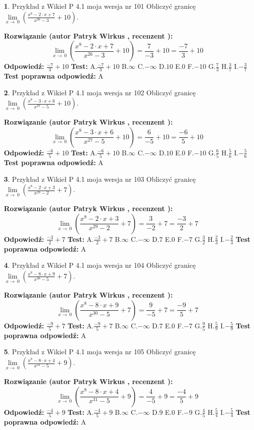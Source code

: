 \documentclass[12pt, a4paper]{article}
\theoremstyle{definition} %
\newtheorem{zad}{}
\newcommand{\zadStart}[1]{\begin{zad}#1\newline}
\newcommand{\zadStop}{\end{zad}}
\newcommand{\rozwStart}[2]{\noindent \textbf{Rozwiązanie (autor #1 , recenzent #2): }\newline}
\newcommand{\rozwStop}{\newline}
\newcommand{\odpStart}{\noindent \textbf{Odpowiedź:}\newline}
\newcommand{\odpStop}{\newline}
\newcommand{\testStart}{\noindent \textbf{Test:}\newline}
\newcommand{\testStop}{\newline}
\newcommand{\kluczStart}{\noindent \textbf{Test poprawna odpowiedź:}\newline}
\newcommand{\kluczStop}{\newline}
\begin{document}
\zadStart{Przykład z Wikieł P 4.1 moja wersja nr 101}
Obliczyć granicę $\lim\limits_{x\to\ 0}(\frac{x^{8}-2 \cdot x +7}{x^{26}-3}+10)$.
\zadStop
\rozwStart{Patryk Wirkus}{}
$$\lim\limits_{x\to\ 0}(\frac{x^{8}-2 \cdot x +7}{x^{26}-3}+10)=\frac{7}{-3}+10=\frac{-7}{3}+10$$
\rozwStop
\odpStart
$\frac{-7}{3}+10$
\odpStop
\testStart
A.$\frac{-7}{3}+10$
B.$\infty$
C.$-\infty$
D.$10$
E.$0$
F.$-10$
G.$\frac{7}{3}$
H.$\frac{3}{7}$
I.$-\frac{3}{7}$
\testStop
\kluczStart
A
\kluczStop



\zadStart{Przykład z Wikieł P 4.1 moja wersja nr 102}
Obliczyć granicę $\lim\limits_{x\to\ 0}(\frac{x^{8}-3 \cdot x +6}{x^{27}-5}+10)$.
\zadStop
\rozwStart{Patryk Wirkus}{}
$$\lim\limits_{x\to\ 0}(\frac{x^{8}-3 \cdot x +6}{x^{27}-5}+10)=\frac{6}{-5}+10=\frac{-6}{5}+10$$
\rozwStop
\odpStart
$\frac{-6}{5}+10$
\odpStop
\testStart
A.$\frac{-6}{5}+10$
B.$\infty$
C.$-\infty$
D.$10$
E.$0$
F.$-10$
G.$\frac{6}{5}$
H.$\frac{5}{6}$
I.$-\frac{5}{6}$
\testStop
\kluczStart
A
\kluczStop



\zadStart{Przykład z Wikieł P 4.1 moja wersja nr 103}
Obliczyć granicę $\lim\limits_{x\to\ 0}(\frac{x^{8}-2 \cdot x +3}{x^{29}-2}+7)$.
\zadStop
\rozwStart{Patryk Wirkus}{}
$$\lim\limits_{x\to\ 0}(\frac{x^{8}-2 \cdot x +3}{x^{29}-2}+7)=\frac{3}{-2}+7=\frac{-3}{2}+7$$
\rozwStop
\odpStart
$\frac{-3}{2}+7$
\odpStop
\testStart
A.$\frac{-3}{2}+7$
B.$\infty$
C.$-\infty$
D.$7$
E.$0$
F.$-7$
G.$\frac{3}{2}$
H.$\frac{2}{3}$
I.$-\frac{2}{3}$
\testStop
\kluczStart
A
\kluczStop



\zadStart{Przykład z Wikieł P 4.1 moja wersja nr 104}
Obliczyć granicę $\lim\limits_{x\to\ 0}(\frac{x^{8}-8 \cdot x +9}{x^{30}-5}+7)$.
\zadStop
\rozwStart{Patryk Wirkus}{}
$$\lim\limits_{x\to\ 0}(\frac{x^{8}-8 \cdot x +9}{x^{30}-5}+7)=\frac{9}{-5}+7=\frac{-9}{5}+7$$
\rozwStop
\odpStart
$\frac{-9}{5}+7$
\odpStop
\testStart
A.$\frac{-9}{5}+7$
B.$\infty$
C.$-\infty$
D.$7$
E.$0$
F.$-7$
G.$\frac{9}{5}$
H.$\frac{5}{9}$
I.$-\frac{5}{9}$
\testStop
\kluczStart
A
\kluczStop



\zadStart{Przykład z Wikieł P 4.1 moja wersja nr 105}
Obliczyć granicę $\lim\limits_{x\to\ 0}(\frac{x^{8}-8 \cdot x +4}{x^{31}-5}+9)$.
\zadStop
\rozwStart{Patryk Wirkus}{}
$$\lim\limits_{x\to\ 0}(\frac{x^{8}-8 \cdot x +4}{x^{31}-5}+9)=\frac{4}{-5}+9=\frac{-4}{5}+9$$
\rozwStop
\odpStart
$\frac{-4}{5}+9$
\odpStop
\testStart
A.$\frac{-4}{5}+9$
B.$\infty$
C.$-\infty$
D.$9$
E.$0$
F.$-9$
G.$\frac{4}{5}$
H.$\frac{5}{4}$
I.$-\frac{5}{4}$
\testStop
\kluczStart
A
\kluczStop
\end{document}
